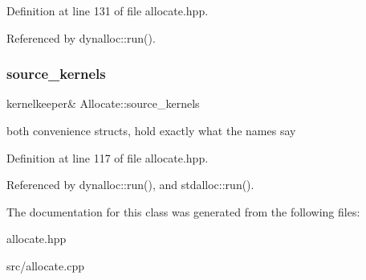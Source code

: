 Definition at line 131 of file allocate.\+hpp.



Referenced by dynalloc\+::run().

\hypertarget{class_allocate_a93e612d7ea7eb686fc88b5dee7a1407b}{}\label{class_allocate_a93e612d7ea7eb686fc88b5dee7a1407b} 
\subsubsection{\texorpdfstring{source\+\_\+kernels}{source\_kernels}}
{\footnotesize\ttfamily kernelkeeper\& Allocate\+::source\+\_\+kernels\hspace{0.3cm}{\ttfamily [protected]}}

both convenience structs, hold exactly what the names say 

Definition at line 117 of file allocate.\+hpp.



Referenced by dynalloc\+::run(), and stdalloc\+::run().



The documentation for this class was generated from the following files\+:\begin{DoxyCompactItemize}
\item 
allocate.\+hpp\item 
src/allocate.\+cpp\end{DoxyCompactItemize}
